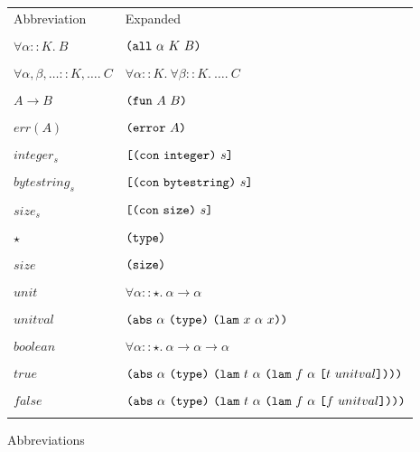 \documentclass[../main.tex]{subfiles}
\begin{document}
\begin{figure*}[t]
    \footnotesize
    \centering
    \begin{tabular}{ll}
        \textrm{Abbreviation} & \textrm{Expanded}\\\\
        
        $\forall \alpha :: K.\ B$ & \(\texttt{(} \texttt{all} ~ \alpha ~ K ~ B \texttt{)}\)\\\\
        
        $\forall \alpha, \beta, \ldots :: K, \ldots.\ C$ & \(\forall \alpha :: K.\ \forall \beta :: K.\ \ldots.\ C\)\\\\
        
        $A \to B$ & \(\texttt{(} \texttt{fun} ~ A ~ B \texttt{)}\)\\\\
        
        $err(A)$ & \(\texttt{(} \texttt{error} ~ A \texttt{)}\)\\\\
        
        $integer_s$ & \(\texttt{[} \texttt{(} \texttt{con} ~ \texttt{integer} \texttt{)} ~ s \texttt{]}\)\\\\
        
        $bytestring_s$ & \(\texttt{[} \texttt{(} \texttt{con} ~ \texttt{bytestring} \texttt{)} ~ s \texttt{]}\)\\\\
        
        $size_s$ & \(\texttt{[} \texttt{(} \texttt{con} ~ \texttt{size} \texttt{)} ~ s \texttt{]}\)\\\\
        
        $\star$ & \(\texttt{(} \texttt{type} \texttt{)}{}\)\\\\
        
        $size$ & \(\texttt{(} \texttt{size} \texttt{)}{}\)\\\\
        
        $unit$ & \(\forall \alpha :: \star.\ \alpha \to \alpha\)\\\\
        
        $unitval$ & \(\texttt{(} \texttt{abs} ~ \alpha ~ \texttt{(} \texttt{type} \texttt{)}{} ~ \texttt{(} \texttt{lam} ~ x ~ \alpha ~ x \texttt{)} \texttt{)}\)\\\\
        
        $boolean$ & \(\forall \alpha :: \star.\ \alpha \to \alpha \to \alpha\)\\\\
        
        $true$ & \(\texttt{(} \texttt{abs} ~ \alpha ~ \texttt{(} \texttt{type} \texttt{)}{} ~ \texttt{(} \texttt{lam} ~ t ~ \alpha ~ \texttt{(} \texttt{lam} ~ f ~ \alpha ~ \texttt{[} t ~ unitval \texttt{]} \texttt{)} \texttt{)} \texttt{)}\)\\\\
        
        $false$ & \(\texttt{(} \texttt{abs} ~ \alpha ~ \texttt{(} \texttt{type} \texttt{)}{} ~ \texttt{(} \texttt{lam} ~ t ~ \alpha ~ \texttt{(} \texttt{lam} ~ f ~ \alpha ~ \texttt{[} f ~ unitval \texttt{]} \texttt{)} \texttt{)} \texttt{)}\)\\\\
        
    \end{tabular}
    
    \caption{Abbreviations}
    \label{fig:Plutus_core_type_abbreviations}
\end{figure*}
\end{document}
